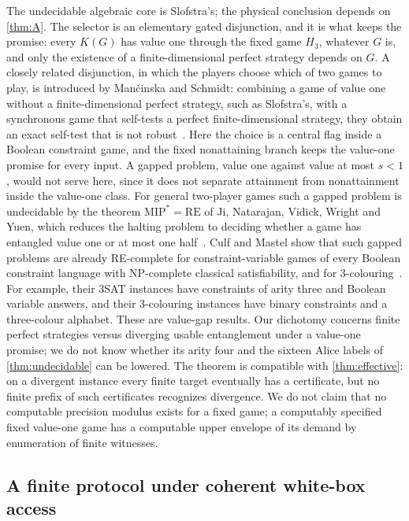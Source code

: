 The undecidable algebraic core is Slofstra's; the physical conclusion depends on \cref{thm:A}. The selector is an
elementary gated disjunction, and it is what keeps the promise: every $K(G)$ has value one through the fixed game $H_3$, whatever
$G$ is, and only the existence of a finite-dimensional perfect strategy depends on $G$. A closely related disjunction, in which the
players choose which of two games to play, is introduced by Man\v{c}inska and Schmidt: combining a game of value one without a
finite-dimensional perfect strategy, such as Slofstra's, with a synchronous game that self-tests a perfect finite-dimensional
strategy, they obtain an exact self-test that is not robust~\cite[Sections~4 and~5]{MaSc23}. Here the choice is a central flag
inside a Boolean constraint game, and the fixed nonattaining branch keeps the value-one promise for every input. A gapped problem,
value one against value at most $s<1$, would not serve here, since it does not separate attainment from nonattainment inside the value-one class.
For general two-player games such a gapped problem is undecidable by the theorem $\mathrm{MIP}^*=\mathrm{RE}$ of Ji,
Natarajan, Vidick, Wright and Yuen, which reduces the halting problem to deciding whether a game has entangled value one or at
most one half~\cite{JNVWY20}. Culf and
Mastel show that such gapped problems are already RE-complete for constraint-variable games of every Boolean constraint language
with NP-complete classical satisfiability, and for 3-colouring~\cite[Theorem~4.14 and Corollary~4.18]{CuMa25}. For example, their
3SAT instances have constraints of arity three and Boolean variable answers, and their 3-colouring instances have binary
constraints and a three-colour alphabet. These are value-gap results. Our dichotomy concerns finite perfect strategies versus
diverging usable entanglement under a value-one promise; we do not know whether its arity four and the sixteen Alice labels of
\cref{thm:undecidable} can be lowered. The theorem is compatible with \cref{thm:effective}: on a divergent instance every finite
target eventually has a certificate, but no finite prefix of such certificates recognizes divergence. We do not claim
that no computable precision modulus exists for a fixed game; a computably specified fixed value-one game has a
computable upper envelope of its demand by enumeration of finite witnesses.

\subsection{A finite protocol under coherent white-box access}\label{sec:protocol}

